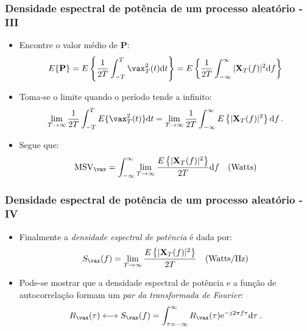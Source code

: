 \begin{frame}
    \frametitle{Densidade espectral de potência de um processo aleatório - III}

    \begin{itemize}
     \item Encontre o valor médio de $\mathbf{P}$:
      \begin{equation}
	  E\{\mathbf{P}\} = E\left\{\frac{1}{2T} \int_{-T}^T \vax_T^2(t) \mathrm{d}t \right\} = E\left\{\frac{1}{2T} \int_{-\infty}^{\infty} |\mathbf{X}_T(f)|^2 \mathrm{d}f \right\}
      \end{equation}
      \item Toma-se o limite quando o período tende a infinito:
      \begin{equation}
	  \lim_{T \rightarrow \infty} \frac{1}{2T} \int_{-T}^T E\{\vax_T^2(t)\} \mathrm{d}t = \lim_{T \rightarrow \infty} \frac{1}{2T} \int_{-\infty}^{\infty} E\left\{ |\mathbf{X}_T(f)|^2 \right\} \mathrm{d}f \, .
      \end{equation}
      \item Segue que:
      \begin{equation}
	  \mathrm{MSV}_{\vax} = \int_{-\infty}^{\infty} \lim_{T \rightarrow \infty} \frac{E\left\{ |\mathbf{X}_T(f)|^2 \right\}}{2T}  \mathrm{d}f \quad \mathrm{(Watts)}
      \end{equation}

    \end{itemize}
          
\end{frame}

\begin{frame}
    \frametitle{Densidade espectral de potência de um processo aleatório - IV}

    \begin{itemize}
     \item Finalmente a \textit{densidade espectral de potência} é dada por:
      \begin{equation}
	  S_{\vax}(f) = \lim_{T \rightarrow \infty}\frac{E\left\{ |\mathbf{X}_T(f)|^2 \right\}}{2T} \quad \mathrm{(Watts/Hz)}
      \end{equation}
      \item Pode-se mostrar que a densidade espectral de potência e a função de autocorrelação formam um \textit{par da transformada de Fourier}:
      \begin{equation}
	  R_{\vax}(\tau) \longleftrightarrow S_{\vax}(f) = \int_{\tau = -\infty}^{\infty} R_{\vax}(\tau)\mathrm{e}^{-j2\pi f\tau}\mathrm{d}\tau \,.
      \end{equation}

    \end{itemize}
          
\end{frame}
 
